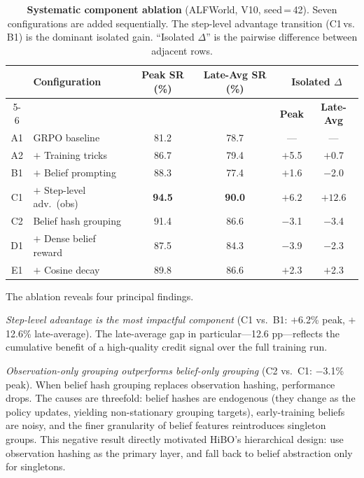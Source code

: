 \begin{table}[t]
  \centering
  \caption{%
    \textbf{Systematic component ablation} (ALFWorld, V10, seed\,=\,42).
    Seven configurations are added sequentially.
    The step-level advantage transition (C1\,vs.\,B1) is the dominant isolated gain.
    ``Isolated $\Delta$'' is the pairwise difference between adjacent rows.
  }
  \label{tab:ablation}
  \vspace{4pt}
  \small
  \renewcommand{\arraystretch}{1.15}
  \begin{tabular}{@{}clcccc@{}}
    \toprule
    & \textbf{Configuration}
      & \textbf{Peak SR (\%)} & \textbf{Late-Avg SR (\%)}
      & \multicolumn{2}{c}{\textbf{Isolated $\Delta$}} \\
    \cmidrule(lr){5-6}
    & & & & \textbf{Peak} & \textbf{Late-Avg} \\
    \midrule
    A1 & GRPO baseline                    & 81.2 & 78.7 & ---         & ---         \\
    A2 & \quad$+$ Training tricks         & 86.7 & 79.4 & $+$5.5      & $+$0.7      \\
    B1 & \quad$+$ Belief prompting        & 88.3 & 77.4 & $+$1.6      & $-$2.0      \\
    C1 & \quad$+$ Step-level adv.\ (obs)  & \textbf{94.5} & \textbf{90.0} & $\mathbf{+6.2}$ & $\mathbf{+12.6}$ \\
    C2 & \quad Belief hash grouping       & 91.4 & 86.6 & $-$3.1      & $-$3.4      \\
    D1 & \quad$+$ Dense belief reward     & 87.5 & 84.3 & $-$3.9      & $-$2.3      \\
    E1 & \quad$+$ Cosine decay            & 89.8 & 86.6 & $+$2.3      & $+$2.3      \\
    \bottomrule
  \end{tabular}
\end{table}

The ablation reveals four principal findings.

\textit{Step-level advantage is the most impactful component} (C1 vs.\ B1: $+$6.2\% peak,
$+$12.6\% late-average).
The late-average gap in particular---12.6 pp---reflects the cumulative benefit of
a high-quality credit signal over the full training run.

\textit{Observation-only grouping outperforms belief-only grouping} (C2 vs.\ C1: $-$3.1\%
peak).
When belief hash grouping replaces observation hashing, performance drops.
The causes are threefold: belief hashes are endogenous (they change as the policy
updates, yielding non-stationary grouping targets), early-training beliefs are noisy,
and the finer granularity of belief features reintroduces singleton groups.
This negative result directly motivated HiBO's hierarchical design: use observation
hashing as the primary layer, and fall back to belief abstraction only for singletons.

